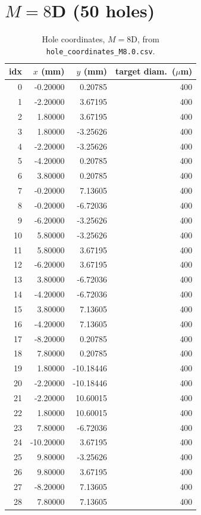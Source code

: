 \section{$M=8$D (50 holes)}
\begin{longtable}{rrrr}
\caption{Hole coordinates, $M=8$D, from \texttt{hole\_coordinates\_M8.0.csv}.}\\
\toprule
idx & $x$ (mm) & $y$ (mm) & target diam.\ ($\mu$m) \\
\midrule
\endhead
0 & -0.20000 & 0.20785 & 400 \\
1 & -2.20000 & 3.67195 & 400 \\
2 & 1.80000 & 3.67195 & 400 \\
3 & 1.80000 & -3.25626 & 400 \\
4 & -2.20000 & -3.25626 & 400 \\
5 & -4.20000 & 0.20785 & 400 \\
6 & 3.80000 & 0.20785 & 400 \\
7 & -0.20000 & 7.13605 & 400 \\
8 & -0.20000 & -6.72036 & 400 \\
9 & -6.20000 & -3.25626 & 400 \\
10 & 5.80000 & -3.25626 & 400 \\
11 & 5.80000 & 3.67195 & 400 \\
12 & -6.20000 & 3.67195 & 400 \\
13 & 3.80000 & -6.72036 & 400 \\
14 & -4.20000 & -6.72036 & 400 \\
15 & 3.80000 & 7.13605 & 400 \\
16 & -4.20000 & 7.13605 & 400 \\
17 & -8.20000 & 0.20785 & 400 \\
18 & 7.80000 & 0.20785 & 400 \\
19 & 1.80000 & -10.18446 & 400 \\
20 & -2.20000 & -10.18446 & 400 \\
21 & -2.20000 & 10.60015 & 400 \\
22 & 1.80000 & 10.60015 & 400 \\
23 & 7.80000 & -6.72036 & 400 \\
24 & -10.20000 & 3.67195 & 400 \\
25 & 9.80000 & -3.25626 & 400 \\
26 & 9.80000 & 3.67195 & 400 \\
27 & -8.20000 & 7.13605 & 400 \\
28 & 7.80000 & 7.13605 & 400 \\

\end{longtable}
